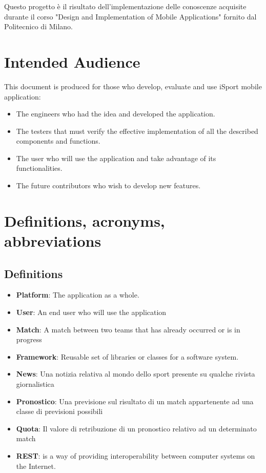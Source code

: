 \documentclass[numbers=noenddot, 12pt, a4paper, oneside]{scrbook}
\begin{document}
Questo progetto è il risultato dell'implementazione delle conoscenze acquisite durante il corso "Design and Implementation of Mobile Applications" fornito dal Politecnico di Milano.

\section{Intended Audience}
This document is produced for those who develop, evaluate and use iSport mobile application:
\begin{itemize}
	\item The engineers who had the idea and developed the application.
	\item The testers that must verify the effective implementation of all the described components and functions.
	\item The user who will use the application and take advantage of its functionalities.
	\item The future contributors who wish to develop new features.
\end{itemize}

\section{Definitions, acronyms, abbreviations}
\subsection*{Definitions}
\begin{itemize}
	\item \textbf{Platform}: The application as a whole.
	\item \textbf{User}: An end user who will use the application
	\item \textbf{Match}: A match between two teams that has already occurred or is in progress
	\item \textbf{Framework}: Reusable set of libraries or classes for a software system.
	\item \textbf{News}: Una notizia relativa al mondo dello sport presente su qualche rivista giornalistica
	\item \textbf{Pronostico}: Una previsione sul risultato di un match appartenente ad una classe di previsioni possibili
	\item \textbf{Quota}: Il valore di retribuzione di un pronostico relativo ad un determinato match
	\item \textbf{REST}: is a way of providing interoperability between computer systems on the Internet.
\end{itemize}
\end{document}
